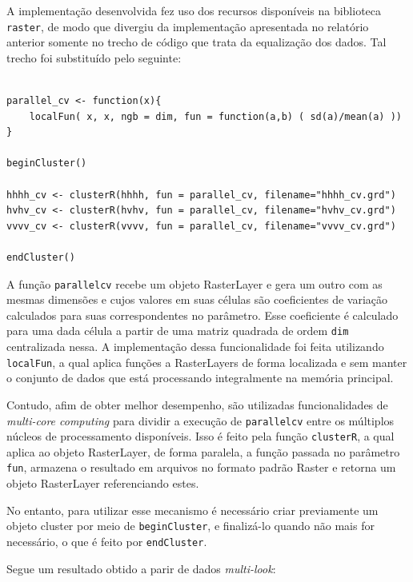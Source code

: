 \documentclass[12pt]{article}
\begin{document}
A implementação desenvolvida fez uso dos recursos disponíveis na biblioteca \texttt{raster}, de modo que divergiu da implementação apresentada no relatório anterior somente no trecho de código que trata da equalização dos dados. Tal trecho foi substituído pelo seguinte:

\begin{verbatim}

parallel_cv <- function(x){ 
    localFun( x, x, ngb = dim, fun = function(a,b) ( sd(a)/mean(a) ))
}

beginCluster()

hhhh_cv <- clusterR(hhhh, fun = parallel_cv, filename="hhhh_cv.grd")
hvhv_cv <- clusterR(hvhv, fun = parallel_cv, filename="hvhv_cv.grd")
vvvv_cv <- clusterR(vvvv, fun = parallel_cv, filename="vvvv_cv.grd")

endCluster()

\end{verbatim}

A função \texttt{parallel}\textunderscore\texttt{cv} recebe um objeto RasterLayer e gera um outro com as mesmas dimensões e cujos valores em suas células são coeficientes de variação calculados para suas correspondentes no parâmetro. Esse coeficiente é calculado para uma dada célula a partir de uma matriz quadrada de ordem \texttt{dim} centralizada nessa. A implementação dessa funcionalidade foi feita utilizando \texttt{localFun}, a qual aplica funções a RasterLayers de forma localizada e sem manter o conjunto de dados que está processando integralmente na memória principal.

Contudo, afim de obter melhor desempenho, são utilizadas funcionalidades de \textit{multi-core computing} para dividir a execução de \texttt{parallel}\textunderscore\texttt{cv} entre os múltiplos núcleos de processamento disponíveis. Isso é feito pela função \texttt{clusterR}, a qual aplica ao objeto RasterLayer, de forma paralela, a função passada no parâmetro \texttt{fun}, armazena o resultado em arquivos no formato padrão Raster e retorna um objeto RasterLayer referenciando estes.

No entanto, para utilizar esse mecanismo é necessário criar previamente um objeto cluster por meio de \texttt{beginCluster}, e finalizá-lo quando não mais for necessário, o que é feito por \texttt{endCluster}.

Segue um resultado obtido a parir de dados \textit{multi-look}:
\end{document}
